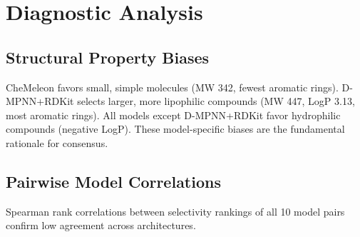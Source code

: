 \documentclass{article}
\begin{document}

\section{Diagnostic Analysis}
\label{app:diagnostics}

\subsection{Structural Property Biases}

\begin{table}[ht]
\caption{Median properties of top-50 candidates (\textit{E.~coli}, $t{=}10$).}
\label{tab:property_bias}
\centering
\scriptsize
{}
\end{table}

CheMeleon favors small, simple molecules (MW 342, fewest aromatic rings).
D-MPNN+RDKit selects larger, more lipophilic compounds (MW 447, LogP 3.13, most aromatic rings).
All models except D-MPNN+RDKit favor hydrophilic compounds (negative LogP).
These model-specific biases are the fundamental rationale for consensus.

\subsection{Pairwise Model Correlations}

Spearman rank correlations between selectivity rankings of all 10 model pairs confirm low agreement across architectures.
\end{document}
